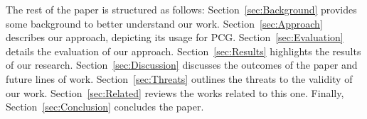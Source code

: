 The rest of the paper is structured as follows: Section~\ref{sec:Background} provides some background to better understand our work. Section~\ref{sec:Approach} describes our approach, depicting its usage for PCG. Section~\ref{sec:Evaluation} details the evaluation of our approach. Section~\ref{sec:Results} highlights the results of our research. Section~\ref{sec:Discussion} discusses the outcomes of the paper and future lines of work. Section~\ref{sec:Threats} outlines the threats to the validity of our work. Section~\ref{sec:Related} reviews the works related to this one. Finally, 
Section~\ref{sec:Conclusion} concludes the paper.
